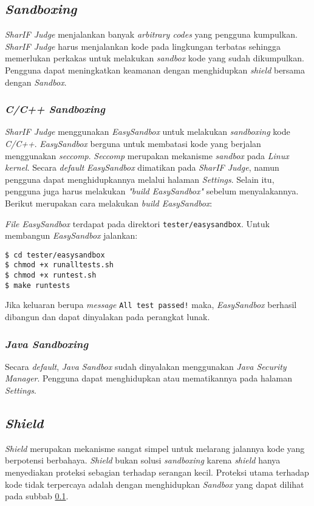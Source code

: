 \subsection{\textit{Sandboxing}}
\label{subsec:sandboxing}
\textit{SharIF Judge} menjalankan banyak \textit{arbitrary codes} yang pengguna kumpulkan. \textit{SharIF Judge} harus menjalankan kode pada lingkungan terbatas sehingga memerlukan perkakas untuk melakukan \textit{sandbox} kode yang sudah dikumpulkan. Pengguna dapat meningkatkan keamanan dengan menghidupkan \textit{shield} bersama dengan \textit{Sandbox}.

\subsubsection{\textit{C/C++ Sandboxing}}
\textit{SharIF Judge} menggunakan \textit{EasySandbox} untuk melakukan \textit{sandboxing} kode \textit{C/C++}. \textit{EasySandbox} berguna untuk membatasi kode yang berjalan menggunakan \textit{seccomp}. \textit{Seccomp} merupakan mekanisme \textit{sandbox} pada \textit{Linux kernel}. Secara \textit{default} \textit{EasySandbox} dimatikan pada \textit{SharIF Judge}, namun pengguna dapat menghidupkannya melalui halaman \textit{Settings}. Selain itu, pengguna juga harus melakukan \textit{"build EasySandbox"} sebelum menyalakannya. Berikut merupakan cara melakukan \textit{build EasySandbox}:

\textit{File EasySandbox} terdapat pada direktori \texttt{tester/easysandbox}. Untuk membangun \textit{EasySandbox} jalankan:

\begin{lstlisting}[caption=Kode \textit{runcode.sh} awal, label=kode:easysandbox]
$ cd tester/easysandbox
$ chmod +x runalltests.sh
$ chmod +x runtest.sh
$ make runtests
\end{lstlisting}

Jika keluaran berupa \textit{message} \texttt{All test passed!} maka, \textit{EasySandbox} berhasil dibangun dan dapat dinyalakan pada perangkat lunak.

\subsubsection{\textit{Java Sandboxing}}
Secara \textit{default}, \textit{Java Sandbox} sudah dinyalakan menggunakan \textit{Java Security Manager}. Pengguna dapat menghidupkan atau mematikannya pada halaman \textit{Settings}.

\subsection{\textit{Shield}}
\label{subsec:shield}
\textit{Shield} merupakan mekanisme sangat simpel untuk melarang jalannya kode yang berpotensi berbahaya. \textit{Shield} bukan solusi \textit{sandboxing} karena \textit{shield} hanya menyediakan proteksi sebagian terhadap serangan kecil. Proteksi utama terhadap kode tidak terpercaya adalah dengan menghidupkan \textit{Sandbox} yang dapat dilihat pada subbab \ref{subsec:sandboxing}.

